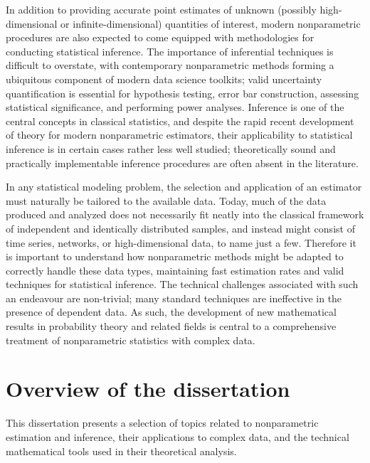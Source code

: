 In addition to providing accurate point estimates of unknown
(possibly high-dimensional or infinite-dimensional) quantities of interest,
modern nonparametric procedures are also expected to come equipped
with methodologies for conducting statistical inference.
The importance of inferential techniques is difficult to overstate,
with contemporary nonparametric methods forming a ubiquitous
component of modern data science toolkits;
valid uncertainty quantification is essential for hypothesis testing,
error bar construction, assessing statistical significance, and
performing power analyses. Inference is one of the central concepts in
classical statistics, and despite the rapid recent development of theory for
modern nonparametric estimators, their applicability to
statistical inference is in certain cases rather less well studied;
theoretically sound and practically implementable
inference procedures are often absent in the literature.

In any statistical modeling problem, the selection and application
of an estimator must
naturally be tailored to the available data. Today, much of the data produced
and analyzed does not necessarily
fit neatly into the classical framework of independent
and identically distributed samples, and instead might consist of time series,
networks, or high-dimensional data, to name just a few. Therefore it is
important to understand how nonparametric methods might be adapted to correctly
handle these data types, maintaining fast estimation rates and valid techniques
for statistical inference.
The technical challenges associated with such an endeavour are non-trivial;
many standard techniques are ineffective in the presence of
dependent data. As such, the development of new
mathematical results in probability theory and related fields
is central to a comprehensive
treatment of nonparametric statistics with complex data.

\section*{Overview of the dissertation}

This dissertation presents a selection of topics related to nonparametric
estimation and inference, their applications to complex data, and the
technical mathematical tools used in their theoretical analysis.

